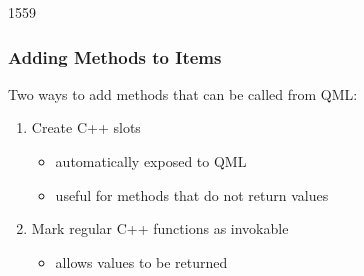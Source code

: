 \begin{slide}{1559}\frametitle{Adding Methods to Items}

Two ways to add methods that can be called from QML:

\vspace*{0.5em}
\begin{enumerate}
\item Create C++ slots
  \begin{itemize}
  \item automatically exposed to QML
  \item useful for methods that do not return values
  \end{itemize}
\item Mark regular C++ functions as invokable
  \begin{itemize}
  \item allows values to be returned
  \end{itemize}
\end{enumerate}

\end{slide}

